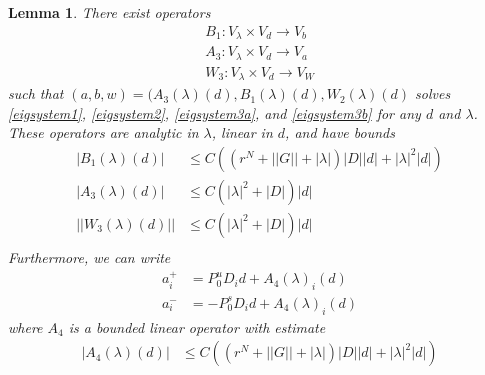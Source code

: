\documentclass[12pt]{article}
\newtheorem{lemma}{Lemma}
\begin{document}
\begin{lemma}\label{eiginv3}
There exist operators 
\begin{align*}
B_1 : V_\lambda \times V_d \rightarrow V_b \\
A_3 : V_\lambda \times V_d \rightarrow V_a \\
W_3 : V_\lambda \times V_d \rightarrow V_W
\end{align*}
such that $(a, b, w) = (A_3(\lambda)(d), B_1(\lambda)(d), W_2(\lambda)(d)$ solves \eqref{eigsystem1}, \eqref{eigsystem2}, \eqref{eigsystem3a}, and \eqref{eigsystem3b} for any $d$ and $\lambda$. These operators are analytic in $\lambda$, linear in $d$, and have bounds 
\begin{align}
|B_1(\lambda)(d)| &\leq C \left( (r^{N} + ||G|| + |\lambda|)|D| |d| + |\lambda|^2 |d| \right) \label{B1bound} \\
|A_3(\lambda)(d)| &\leq C \left(|\lambda|^2 + |D|\right)|d| \label{A3bound} \\
||W_3(\lambda)(d)|| &\leq C \left(|\lambda|^2 + |D|\right)|d| \label{W3bound} \\
\end{align}
Furthermore, we can write
\begin{align*}
a_i^+ &= P_0^u D_i d + A_4(\lambda)_i(d) \\
a_i^- &= -P_0^s D_i d + A_4(\lambda)_i(d)
\end{align*}
where $A_4$ is a bounded linear operator with estimate
\begin{align}\label{A4bound}
|A_4(\lambda)(d)| &\leq 
C\left( (r^N + ||G|| + |\lambda|)|D||d| + |\lambda|^2 |d|  \right)
\end{align}


\end{lemma}
\end{document}
